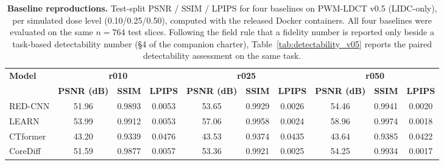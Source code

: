 \documentclass[twoside,11pt]{article}
\begin{document}
\begin{table}[ht]
    \centering
    \small
    \setlength{\tabcolsep}{4pt}
    \begin{tabular}{lccccccccc}
        \toprule
        \multirow{2}{*}{\textbf{Model}} & \multicolumn{3}{c}{\textbf{r010}} & \multicolumn{3}{c}{\textbf{r025}} & \multicolumn{3}{c}{\textbf{r050}} \\
        \cmidrule(lr){2-4} \cmidrule(lr){5-7} \cmidrule(lr){8-10}
        & \textbf{PSNR (dB)} & \textbf{SSIM} & \textbf{LPIPS} & \textbf{PSNR (dB)} & \textbf{SSIM} & \textbf{LPIPS} & \textbf{PSNR (dB)} & \textbf{SSIM} & \textbf{LPIPS} \\
        \midrule
        RED-CNN   & 51.96 & 0.9893 & 0.0053 & 53.65 & 0.9929 & 0.0026 & 54.46 & 0.9941 & 0.0020 \\
        LEARN     & 53.99 & 0.9912 & 0.0053 & 57.06 & 0.9958 & 0.0024 & 58.96 & 0.9974 & 0.0018 \\
        CTformer  & 43.20 & 0.9339 & 0.0476 & 43.53 & 0.9374 & 0.0435 & 43.64 & 0.9385 & 0.0422 \\
        CoreDiff  & 51.59 & 0.9877 & 0.0057 & 53.36 & 0.9921 & 0.0025 & 54.25 & 0.9934 & 0.0017 \\
        \bottomrule
    \end{tabular}
    \caption{\textbf{Baseline reproductions.} Test-split PSNR / SSIM / LPIPS for four baselines on PWM-LDCT v0.5 (LIDC-only), per simulated dose level (0.10/0.25/0.50), computed with the released Docker containers. All four baselines were evaluated on the same $n = 764$ test slices. Following the field rule that a fidelity number is reported only beside a task-based detectability number (\S 4 of the companion charter), Table~\ref{tab:detectability_v05} reports the paired detectability assessment on the same task.}
    \label{tab:baselines_v05}
\end{table}
\end{document}
